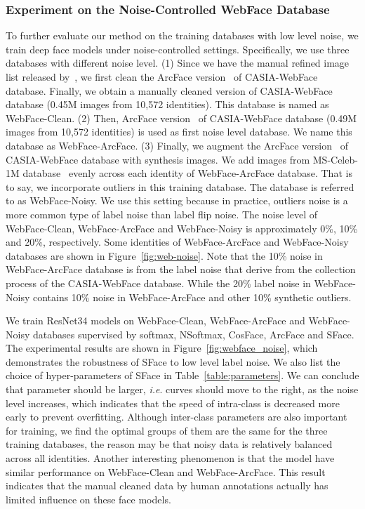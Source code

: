\documentclass[journal,comsoc]{IEEEtran}
\begin{document}
\subsubsection{Experiment on the Noise-Controlled WebFace Database}
To further evaluate our method on the training databases with low level noise, we train deep face models under noise-controlled settings. Specifically, we use three databases with different noise level. (1) Since we have the manual refined image list released by~\cite{rwebface_wang}, we first clean the ArcFace version~\cite{deng2019arcface} of CASIA-WebFace database. Finally, we obtain a manually cleaned version of CASIA-WebFace database (0.45M images from 10,572 identities). This database is named as WebFace-Clean. (2) Then, ArcFace version~\cite{deng2019arcface} of CASIA-WebFace database (0.49M images from 10,572 identities) is used as first noise level database. We name this database as WebFace-ArcFace. (3) Finally, we augment the ArcFace version~\cite{deng2019arcface} of CASIA-WebFace database with synthesis images. We add images from MS-Celeb-1M database~\cite{guo2016msceleb} evenly across each identity of WebFace-ArcFace database. That is to say, we incorporate outliers in this training database. The database is referred to as WebFace-Noisy. We use this setting because in practice, outliers noise is a more common type of label noise than label flip noise. The noise level of WebFace-Clean, WebFace-ArcFace and WebFace-Noisy is approximately 0\%, 10\% and 20\%, respectively. Some identities of WebFace-ArcFace and WebFace-Noisy databases are shown in Figure~\ref{fig:web-noise}. Note that the 10\% noise in WebFace-ArcFace database is from the label noise that derive from the collection process of the CASIA-WebFace database. While the 20\% label noise in WebFace-Noisy contains 10\% noise in WebFace-ArcFace and other 10\% synthetic outliers. 

We train ResNet34 models on WebFace-Clean, WebFace-ArcFace and WebFace-Noisy databases supervised by softmax, NSoftmax, CosFace, ArcFace and SFace. The experimental results are shown in Figure~\ref{fig:webface_noise}, which demonstrates the robustness of SFace to low level label noise. We also list the choice of hyper-parameters of SFace in Table~\ref{table:parameters}. We can conclude that parameter  should be larger, \emph{i.e}.  curves should move to the right, as the noise level increases, which indicates that the speed of intra-class is decreased more early to prevent overfitting. Although inter-class parameters  are also important for training, we find the optimal groups of them are the same for the three training databases, the reason may be that noisy data is relatively balanced across all identities. Another interesting phenomenon is that the model have similar performance on WebFace-Clean and WebFace-ArcFace. This result indicates that the manual cleaned data by human annotations actually has limited influence on these face models. 
\end{document}
